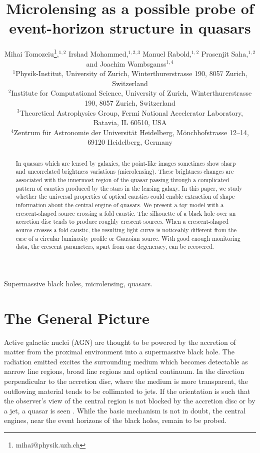\documentclass[usenatbib]{mn2e}
\title{Microlensing as a possible probe of event-horizon structure in quasars}
\author[Tomozeiu et al]{Mihai Tomozeiu\thanks{mihai@physik.uzh.ch},$^{1,2}$ 
Irshad Mohammed,$^{1,2,3}$ 
Manuel Rabold,$^{1,2}$
Prasenjit Saha,$^{1,2}$  
\newauthor
and Joachim Wambsganss$^{1,4}$\\
$^1${Physik-Institut, University of Zurich, Winterthurerstrasse 190,
  8057 Zurich, Switzerland} \\
$^2${Institute for Computational Science, University of Zurich,
  Winterthurerstrasse 190, 8057 Zurich, Switzerland} \\
$^3${Theoretical Astrophysics Group, Fermi National Accelerator Laboratory, Batavia, IL 60510, USA}\\
$^4${Zentrum f\"ur Astronomie der Universit\"at Heidelberg,
  M\"onchhofstrasse 12--14, 69120 Heidelberg, Germany}
}
\begin{document}
\maketitle

\begin{abstract}

In quasars which are lensed by galaxies, the point-like images sometimes show sharp and uncorrelated brightness 
variations (microlensing). These brightness changes are associated with the innermost region of the quasar passing 
through a complicated pattern of caustics produced by the stars in the lensing galaxy. In this paper, we study 
whether the universal properties of optical caustics could enable extraction of shape information about the central 
engine of quasars. We present a toy model with a crescent-shaped source crossing a fold caustic. The silhouette 
of a black hole over an accretion disc tends to produce roughly crescent sources. When a crescent-shaped source 
crosses a fold caustic, the resulting light curve is noticeably different from the case of a circular luminosity 
profile or Gaussian source. With good enough monitoring data, the crescent parameters, apart from one degeneracy, 
can be recovered.

\end{abstract}


\begin{keywords}
Supermassive black holes, microlensing, quasars.
\end{keywords}

\section{The General Picture }

Active galactic nuclei (AGN) are thought to be powered by the accretion of
matter from the proximal environment into a supermassive black hole.
The radiation emitted excites the surrounding medium which becomes
detectable as narrow line regions, broad line regions and optical
continuum.  In the direction perpendicular to the accretion disc,
where the medium is more transparent, the outflowing material tends to be
collimated to jets.  If the orientation is such that the observer's
view of the central region is not blocked by the accretion disc or by
a jet, a quasar is seen \citep[e.g.,][]{1984RvMP...56..255B}.  While
the basic mechanism \citep[originating in the work
  of][]{1964ApJ...140..796S,1964SPhD....9..246Z,1969Natur.223..690L}
is not in doubt, the central engines, near the event horizons of the
black holes, remain to be probed.
\end{document}
